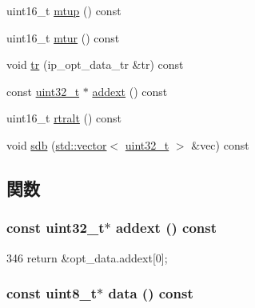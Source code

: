 \begin{DoxyCompactItemize}
\item 
uint16\_\-t \hyperlink{structNet_1_1IpOpt_a8575b82df43e40c41d2dc3e23563924a}{mtup} () const 
\item 
uint16\_\-t \hyperlink{structNet_1_1IpOpt_afd89c74369442ef3d38570103bafb2b9}{mtur} () const 
\item 
void \hyperlink{structNet_1_1IpOpt_ace178303b38d98788c16c141f3b55971}{tr} (ip\_\-opt\_\-data\_\-tr \&tr) const 
\item 
const \hyperlink{Type_8hh_a435d1572bf3f880d55459d9805097f62}{uint32\_\-t} $\ast$ \hyperlink{structNet_1_1IpOpt_a1ba4b27f70795a232d47b7de4bec0a63}{addext} () const 
\item 
uint16\_\-t \hyperlink{structNet_1_1IpOpt_a00f74d6764a9468eb1192d5434140717}{rtralt} () const 
\item 
void \hyperlink{structNet_1_1IpOpt_acb263b631e7b25b777b2300a459dde33}{sdb} (\hyperlink{classstd_1_1vector}{std::vector}$<$ \hyperlink{Type_8hh_a435d1572bf3f880d55459d9805097f62}{uint32\_\-t} $>$ \&vec) const 
\end{DoxyCompactItemize}


\subsection{関数}
\hypertarget{structNet_1_1IpOpt_a1ba4b27f70795a232d47b7de4bec0a63}{
\subsubsection[{addext}]{\setlength{\rightskip}{0pt plus 5cm}const {\bf uint32\_\-t}$\ast$ addext () const}}
\label{structNet_1_1IpOpt_a1ba4b27f70795a232d47b7de4bec0a63}



\begin{DoxyCode}
346 { return &opt_data.addext[0]; }
\end{DoxyCode}
\hypertarget{structNet_1_1IpOpt_a40fe50b14bf164129156972247acb8e4}{
\subsubsection[{data}]{\setlength{\rightskip}{0pt plus 5cm}const uint8\_\-t$\ast$ data () const}}
\label{structNet_1_1IpOpt_a40fe50b14bf164129156972247acb8e4}



